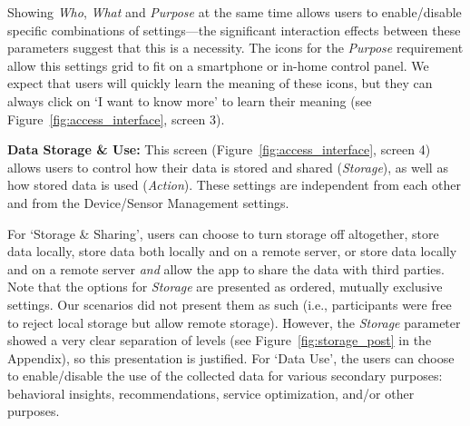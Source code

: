 Showing \emph{Who}, \emph{What} and \emph{Purpose} at the same time allows users to enable/disable specific combinations of settings---the significant interaction effects between these parameters suggest that this is a necessity. The icons for the \emph{Purpose} requirement allow this settings grid to fit on a smartphone or in-home control panel. We expect that users will quickly learn the meaning of these icons, but they can always click on `I want to know more' to learn their meaning (see Figure~\ref{fig:access_interface}, screen 3). 



\textbf{Data Storage \& Use:} This screen (Figure~\ref{fig:access_interface}, screen 4) allows users to control how their data is stored and shared (\emph{Storage}), as well as how stored data is used (\emph{Action}). These settings are independent from each other and from the Device/Sensor Management settings. 

For `Storage \& Sharing', users can choose to turn storage off altogether, store data locally, store data both locally and on a remote server, or store data locally and on a remote server \emph{and} allow the app to share the data with third parties. Note that the options for \emph{Storage} are presented as ordered, mutually exclusive settings. Our scenarios did not present them as such (i.e., participants were free to reject local storage but allow remote storage). However, the \emph{Storage} parameter showed a very clear separation of levels (see Figure~\ref{fig:storage_post} in the Appendix), so this presentation is justified. For `Data Use', the users can choose to enable/disable the use of the collected data for various secondary purposes: behavioral insights, recommendations, service optimization, and/or other purposes.

